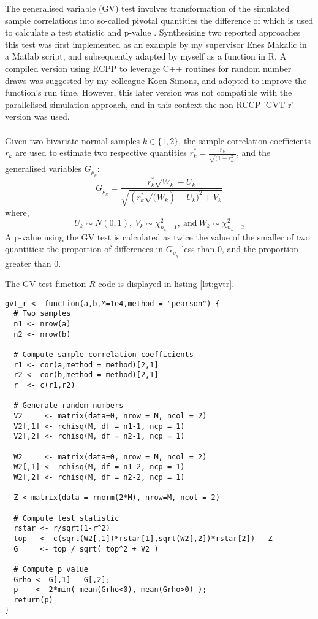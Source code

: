 The generalised variable (GV) test involves transformation of the simulated sample correlations into so-called pivotal quantities the difference of which is used to calculate a test statistic and p-value \cite{Krishnamoorthy2014}. Synthesising two reported approaches \cite{Krishnamoorthy2007,Kazemi2016} this test was first implemented as an example by my supervisor Enes Makalic in a Matlab script, and subsequently adapted by myself as a function in R.  A compiled version using RCPP to leverage C++ routines for random number draws was suggested by my colleague Koen Simons, and adopted to improve the function's run time. However, this later version was not compatible with the parallelised simulation approach, and in this context the non-RCCP 'GVT-r' version was used.
\\
\\
Given two bivariate normal samples $k\in\{1,2\}$, the sample correlation coefficients $r_k$ are used to estimate two respective quantities $r_k^* = \frac{r_k}{\sqrt(1-r_k^2)}$, and the generalised variables $G_{\rho_k}$:
$$G_{\rho_k} = \frac{r_k^*\sqrt{W_k} - U_k}{\sqrt{(r_k^*\sqrt(W_k) - U_k)^2 + V_k}}$$
where,
$$U_k \sim N(0,1) ,\ V_k \sim \chi_{n_k - 1}^2 ,\ \text{and} \ W_k \sim \chi_{n_k-2}^2$$
A p-value using the GV test is calculated as twice the value of the smaller of two quantities: the proportion of differences in $G_{\rho_k}$ less than 0, and the proportion greater than 0.

The GV test function $R$ code is displayed in listing \ref{lst:gvtr}.

\begin{lstlisting}[float=h,caption={GV test (R version)},label={lst:gvtr}]
gvt_r <- function(a,b,M=1e4,method = "pearson") {
  # Two samples
  n1 <- nrow(a)
  n2 <- nrow(b)
  
  # Compute sample correlation coefficients
  r1 <- cor(a,method = method)[2,1]
  r2 <- cor(b,method = method)[2,1]
  r  <- c(r1,r2)
  
  # Generate random numbers
  V2     <- matrix(data=0, nrow = M, ncol = 2)
  V2[,1] <- rchisq(M, df = n1-1, ncp = 1)
  V2[,2] <- rchisq(M, df = n2-1, ncp = 1)
  
  W2     <- matrix(data=0, nrow = M, ncol = 2)
  W2[,1] <- rchisq(M, df = n1-2, ncp = 1)
  W2[,2] <- rchisq(M, df = n2-2, ncp = 1)
  
  Z <-matrix(data = rnorm(2*M), nrow=M, ncol = 2)
  
  # Compute test statistic
  rstar <- r/sqrt(1-r^2)
  top   <- c(sqrt(W2[,1])*rstar[1],sqrt(W2[,2])*rstar[2]) - Z
  G     <- top / sqrt( top^2 + V2 )
  
  # Compute p value
  Grho <- G[,1] - G[,2];
  p    <- 2*min( mean(Grho<0), mean(Grho>0) ); 
  return(p)
}
\end{lstlisting}

